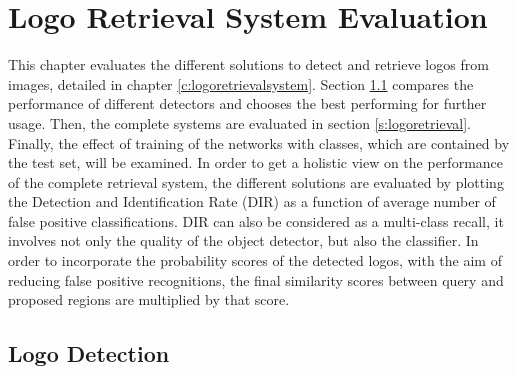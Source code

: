 \chapter{Logo Retrieval System Evaluation}\label{c:evaluation}

This chapter evaluates the different solutions to detect and retrieve logos from images, detailed in chapter \ref{c:logoretrievalsystem}. Section \ref{s:explogodetection} compares the performance of different detectors and chooses the best performing for further usage. Then, the complete systems are evaluated in section \ref{s:logoretrieval}. Finally, the effect of training of the networks with classes, which are contained by the test set, will be examined.
\bigbreak
In order to get a holistic view on the performance of the complete retrieval system, the different solutions are evaluated by plotting the Detection and Identification Rate (DIR) as a function of average number of false positive classifications. DIR can also be considered as a multi-class recall, it involves not only the quality of the object detector, but also the classifier. In order to incorporate the probability scores of the detected logos, with the aim of reducing false positive recognitions, the final similarity scores between query and proposed regions are multiplied by that score.
\bigbreak
\section{Logo Detection}\label{s:explogodetection}

